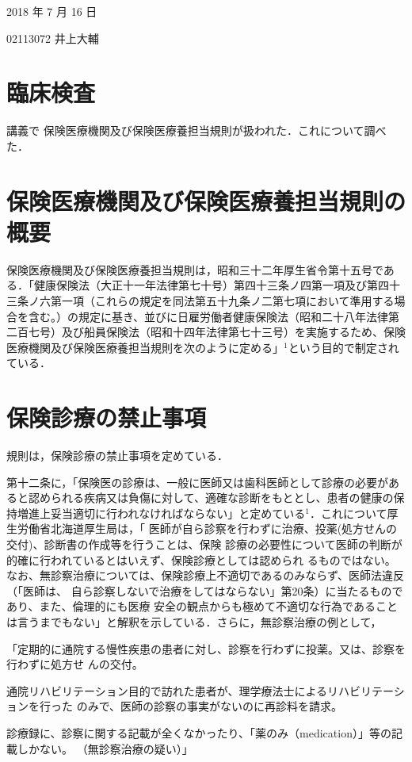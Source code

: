 \documentclass[11pt,dvipdfmx,uplatex]{jsarticle}
\begin{document}
2018 年 7 月 16 日

02113072 井上大輔
\section*{臨床検査}

講義で 保険医療機関及び保険医療養担当規則が扱われた．これについて調べた．

\section{保険医療機関及び保険医療養担当規則の概要}

保険医療機関及び保険医療養担当規則は，昭和三十二年厚生省令第十五号である．「健康保険法（大正十一年法律第七十号）第四十三条ノ四第一項及び第四十三条ノ六第一項（これらの規定を同法第五十九条ノ二第七項において準用する場合を含む。）の規定に基き、並びに日雇労働者健康保険法（昭和二十八年法律第二百七号）及び船員保険法（昭和十四年法律第七十三号）を実施するため、保険医療機関及び保険医療養担当規則を次のように定める」$^1$という目的で制定されている．


\section{保険診療の禁止事項}

規則は，保険診療の禁止事項を定めている．

第十二条に，「保険医の診療は、一般に医師又は歯科医師として診療の必要があると認められる疾病又は負傷に対して、適確な診断をもととし、患者の健康の保持増進上妥当適切に行われなければならない」と定めている$^1$．これについて厚生労働省北海道厚生局は，「 医師が自ら診察を行わずに治療、投薬(処方せんの交付)、診断書の作成等を行うことは、保険
診療の必要性について医師の判断が的確に行われているとはいえず、保険診療としては認められ
るものではない。
  なお、無診察治療については、保険診療上不適切であるのみならず、医師法違反（「医師は、
自ら診察しないで治療をしてはならない」第20条）に当たるものであり、また、倫理的にも医療
	安全の観点からも極めて不適切な行為であることは言うまでもない」と解釈を示している．さらに，無診察治療の例として，

「定期的に通院する慢性疾患の患者に対し、診察を行わずに投薬。又は、診察を行わずに処方せ
んの交付。 

通院リハビリテーション目的で訪れた患者が、理学療法士によるリハビリテーションを行った
のみで、医師の診察の事実がないのに再診料を請求。 

診療録に、診察に関する記載が全くなかったり、「薬のみ（medication）」等の記載しかない。
（無診察治療の疑い）」
\end{document}
